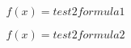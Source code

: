 

\begin{equation}
f(x) = test2 formula1
\end{equation}

\begin{equation}
f(x) = test2 formula2
\end{equation}

